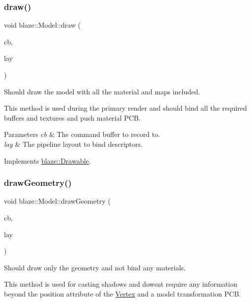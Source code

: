 \subsubsection{\texorpdfstring{draw()}{draw()}}
{\footnotesize\ttfamily void blaze\+::\+Model\+::draw (\begin{DoxyParamCaption}\item[{Vk\+Command\+Buffer}]{cb,  }\item[{Vk\+Pipeline\+Layout}]{lay }\end{DoxyParamCaption})\hspace{0.3cm}{\ttfamily [virtual]}}



Should draw the model with all the material and maps included. 

This method is used during the primary render and should bind all the required buffers and textures and push material P\+CB.


\begin{DoxyParams}{Parameters}
{\em cb} & The command buffer to record to. \\
\hline
{\em lay} & The pipeline layout to bind descriptors. \\
\hline
\end{DoxyParams}


Implements \hyperlink{classblaze_1_1Drawable_a810b411ced93f27781a40a170714b590}{blaze\+::\+Drawable}.

\mbox{\label{classblaze_1_1Model_ab5427d1b48ee3aedea9e405aa3892f5c}} 
\subsubsection{\texorpdfstring{draw\+Geometry()}{drawGeometry()}}
{\footnotesize\ttfamily void blaze\+::\+Model\+::draw\+Geometry (\begin{DoxyParamCaption}\item[{Vk\+Command\+Buffer}]{cb,  }\item[{Vk\+Pipeline\+Layout}]{lay }\end{DoxyParamCaption})\hspace{0.3cm}{\ttfamily [virtual]}}



Should draw only the geometry and not bind any materials. 

This method is used for casting shadows and dowsn\textquotesingle{}t require any information beyond the position attribute of the \hyperlink{structblaze_1_1Vertex}{Vertex} and a model transformation P\+CB.


